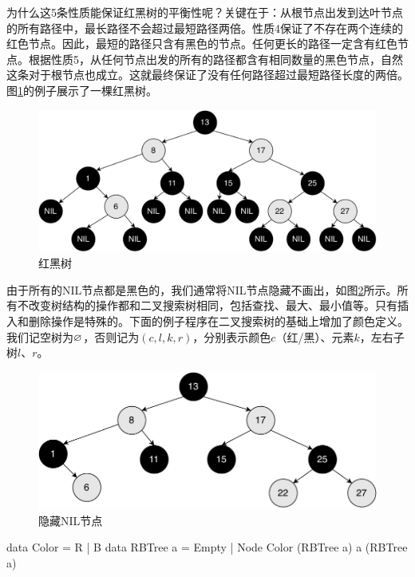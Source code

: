 \documentclass[b5paper]{ctexart}
\begin{document}
为什么这5条性质能保证红黑树的平衡性呢？关键在于：从根节点出发到达叶节点的所有路径中，最长路径不会超过最短路径两倍。性质4保证了不存在两个连续的红色节点。因此，最短的路径只含有黑色的节点。任何更长的路径一定含有红色节点。根据性质5，从任何节点出发的所有的路径都含有相同数量的黑色节点，自然这条对于根节点也成立。这就最终保证了没有任何路径超过最短路径长度的两倍\cite{wiki-rbt}。图\ref{fig:rbt-example-with-nil}的例子展示了一棵红黑树。

\begin{figure}[htbp]
  \centering
  \includegraphics[scale=0.35]{img/rbt-example-with-nil}
  \caption{红黑树}
  \label{fig:rbt-example-with-nil}
\end{figure}

由于所有的NIL节点都是黑色的，我们通常将NIL节点隐藏不画出，如图\ref{fig:rbt-example}所示。所有不改变树结构的操作都和二叉搜索树相同，包括查找、最大、最小值等。只有插入和删除操作是特殊的。下面的例子程序在二叉搜索树的基础上增加了颜色定义。我们记空树为$\varnothing$，否则记为$(c, l, k, r)$，分别表示颜色$c$（红/黑）、元素$k$，左右子树$l$、$r$。

\begin{figure}[htbp]
  \centering
  \includegraphics[scale=0.4]{img/rbt-example}
  \caption{隐藏NIL节点}
  \label{fig:rbt-example}
\end{figure}

\begin{Haskell}
data Color = R | B
data RBTree a = Empty | Node Color (RBTree a) a (RBTree a)
\end{Haskell}
\end{document}
